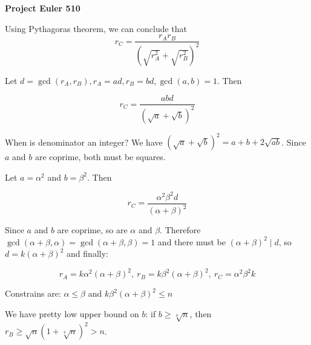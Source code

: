 \documentclass[a4paper,12pt]{article}
\begin{document}
\setlength\parindent{0pt}
\textbf{Project Euler 510}
\vspace{5ex}

Using Pythagoras theorem, we can conclude that \[r_C =  \frac{r_A r_B}{\left( \sqrt{r_A^2} + \sqrt{r_B^2} \right)^2}\]

Let \(d = \gcd(r_A, r_B), r_A = ad, r_B = bd, \gcd(a, b) = 1\). Then

\[r_C = \frac{abd}{\left(\sqrt{a} + \sqrt{b}\right)^2}\]

When is denominator an integer? We have \(\left(\sqrt{a} + \sqrt{b}\right)^2 = a + b + 2 \sqrt{ab}\). Since \(a\) and \(b\) are coprime, both must be squares.

Let \(a = \alpha^2\) and \(b = \beta^2\). Then

\[r_C = \frac{\alpha^2 \beta^2 d}{\left(\alpha + \beta\right)^2}\]

Since \(a\) and \(b\) are coprime, so are \(\alpha\) and \(\beta\). Therefore \(\gcd(\alpha + \beta, \alpha) = \gcd(\alpha + \beta, \beta) = 1\) and there must be \((\alpha + \beta)^2 \mid d\), so \(d = k(\alpha + \beta)^2\) and finally:

\[r_A = k\alpha^2\left(\alpha + \beta\right)^2, \ r_B = k\beta^2\left(\alpha + \beta\right)^2, \ r_C = \alpha^2\beta^2k\]

Constrains are: \(\alpha \leq \beta\) and \(k\beta^2\left(\alpha + \beta\right)^2 \leq n\)

We have pretty low upper bound on \(b\): if \(b \geq \sqrt[4]{n}\), then \(r_B \geq \sqrt{n} (1 + \sqrt[4]{n})^2 > n\).
\end{document}
